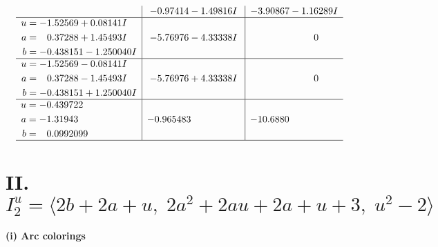 \documentclass[1p]{elsarticle_modified}
\theoremstyle{definition}
\begin{document}
$$\begin{array}{c|c|c}
 & -0.97414 - 1.49816 I & -3.90867 - 1.16289 I \\ \hline\begin{aligned}
u &= -1.52569 + 0.08141 I \\
a &= \phantom{-}0.37288 + 1.45493 I \\
b &= -0.438151 - 1.250040 I\end{aligned}
 & -5.76976 - 4.33338 I & \phantom{-0.000000 } 0 \\ \hline\begin{aligned}
u &= -1.52569 - 0.08141 I \\
a &= \phantom{-}0.37288 - 1.45493 I \\
b &= -0.438151 + 1.250040 I\end{aligned}
 & -5.76976 + 4.33338 I & \phantom{-0.000000 } 0 \\ \hline\begin{aligned}
u &= -0.439722\phantom{ +0.000000I} \\
a &= -1.31943\phantom{ +0.000000I} \\
b &= \phantom{-}0.0992099\phantom{ +0.000000I}\end{aligned}
 & -0.965483\phantom{ +0.000000I} & -10.6880\phantom{ +0.000000I}\\
 \hline 
 \end{array}$$\newpage\newpage\renewcommand{\arraystretch}{1}
\centering \section*{II. $I^u_{2}= \langle 2 b+2 a+u,\;2 a^2+2 a u+2 a+u+3,\;u^2-2 \rangle$}
\flushleft \textbf{(i) Arc colorings}\\
\end{document}

